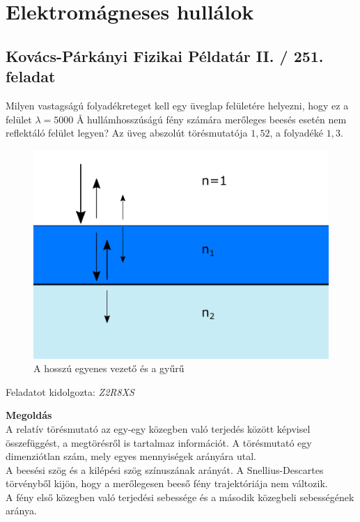 \documentclass[11pt,a4paper,openany,leqno]{article}
\begin{document}
\section{Elektromágneses hullálok}
\subsection{Kovács-Párkányi Fizikai Példatár II. / 251. feladat}
Milyen vastagságú folyadékreteget kell egy üveglap felületére helyezni, hogy ez a felület $\lambda = 5000 $ Å hullámhosszúságú fény számára merőleges beesés esetén nem reflektáló felület legyen? Az üveg abszolút törésmutatója $1,52$, a folyadéké $1,3$.
\begin{figure}[h!]
\centering
  \includegraphics[width=120mm,scale=0.5]{kep.pdf}
  \caption{A hosszú egyenes vezető és a gyűrű}
  \label{}
\end{figure} 
 \indent





\begin{flushright} {Feladatot kidolgozta: {\it Z2R8XS}} \end{flushright}

\vspace{0.5cm}

\textbf{Megoldás}\\
\indent
A relatív törésmutató az egy-egy közegben való terjedés között képvisel összefüggést, a megtörésről is tartalmaz információt. A törésmutató egy dimenziótlan szám, mely egyes mennyiségek arányára utal.\\
\indent A beesési szög és a kilépési szög színuszának arányát. A Snellius-Descartes törvényből kijön, hogy a merőlegesen beeső fény trajektóriája nem változik.\\
\indent A fény első közegben való terjedési sebessége és a második közegbeli sebességének aránya.\\
\end{document}

